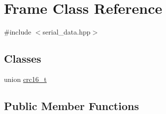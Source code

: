 \hypertarget{classFrame}{}\section{Frame Class Reference}
\label{classFrame}


{\ttfamily \#include $<$serial\+\_\+data.\+hpp$>$}

\subsection*{Classes}
\begin{DoxyCompactItemize}
\item 
union \hyperlink{unionFrame_1_1crc16__t}{crc16\+\_\+t}
\end{DoxyCompactItemize}
\subsection*{Public Member Functions}
